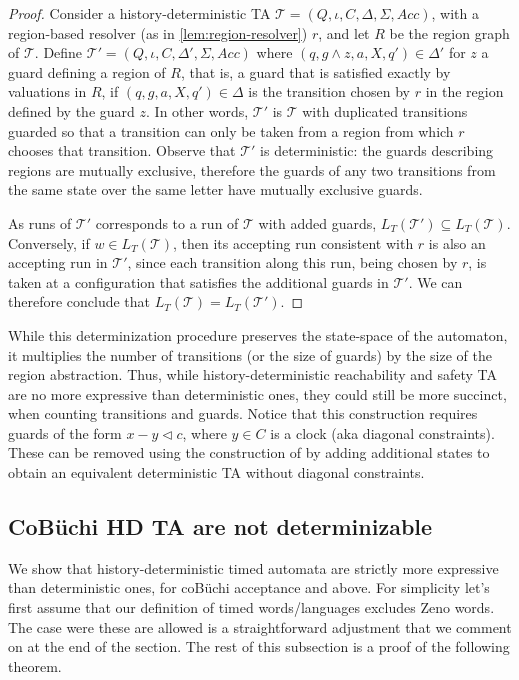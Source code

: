 \documentclass[10pt,a4paper]{amsart}
\theoremstyle{definition}
\numberwithin{equation}{section}
\newcommand{\T}{\mathcal{T}}
\newcommand{\clocks}{C}
\newcommand{\acc}{\mathit{Acc}}
\newcommand{\lang}{L_T}  %
\begin{document}
\begin{proof}
Consider a history-deterministic TA $\T=(Q,\iota,C,\Delta,\Sigma, \acc)$, with a region-based resolver (as in \cref{lem:region-resolver}) $r$, and let $R$ be the region graph of $\T$. Define $\T'=(Q,\iota,C,\Delta',\Sigma, \acc)$ where $(q,g\wedge z,a,X,q')\in \Delta'$  for $z$ a guard defining a region of $R$, that is, a guard that is satisfied exactly by valuations in $R$, if $(q,g,a,X,q')\in \Delta$ is the transition chosen by $r$ in the region defined by the guard $z$.
 In other words, $\T'$ is $\T$ with duplicated transitions guarded so that a transition can only be taken from a region from which $r$ chooses that transition. 
 Observe that $\T'$ is deterministic: the guards describing regions are mutually exclusive,  therefore the guards of any two transitions from the same state over the same letter have mutually exclusive guards.

As runs of $\T'$ corresponds to a run of $\T$ with added guards, $\lang(\T')\subseteq \lang(\T)$. Conversely, if $w\in \lang(\T)$, then its accepting run consistent with $r$ is also an accepting run in $\T'$, since each transition along this run, being chosen by $r$, is taken at a configuration that satisfies the additional guards in $\T'$. We can therefore conclude that $\lang(\T)=\lang(\T')$.
\end{proof}


While this determinization procedure preserves the state-space of the automaton, %
it multiplies the number of transitions (or the size of guards) by the size of the region abstraction. Thus, while history-deterministic reachability and safety TA are no more expressive than deterministic ones, they could still be more succinct, 
when counting transitions and guards.
Notice that this construction requires guards of the form $x-y\triangleleft c$, where $y\in\clocks$ is a clock (aka diagonal constraints). 
These can be removed using the construction of \cite{BPDG98} by adding additional states to obtain an equivalent deterministic TA without diagonal constraints.


\subsection{CoB\"uchi HD TA are not determinizable}
\label{sec:expressivity:d-hd}

We show that history-deterministic timed automata are strictly more expressive than deterministic ones, for coB\"uchi acceptance and above.
For simplicity let's first assume that our definition of timed words/languages excludes Zeno words.
The case were these are allowed is a straightforward adjustment that we comment on at the end of the section.
The rest of this subsection is a proof of the following theorem.
\end{document}
